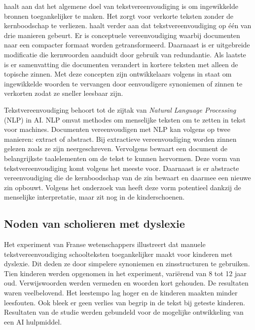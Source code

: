 \textcite{Shardlow2014} haalt aan dat het algemene doel van tekstvereenvoudiging is om ingewikkelde bronnen toegankelijker te maken. Het zorgt voor verkorte teksten zonder de kernboodschap te verliezen. \textcite{Siddharthan2014} haalt verder aan dat tekstvereenvoudiging op één van drie manieren gebeurt. Er is conceptuele vereenvoudiging waarbij documenten naar een compacter formaat worden getransformeerd. Daarnaast is er uitgebreide modificatie die kernwoorden aanduidt door gebruik van redundantie. Als laatste is er samenvatting die documenten verandert in kortere teksten met alleen de topische zinnen. Met deze concepten zijn ontwikkelaars volgens \textcite{Siddharthan2014} in staat om ingewikkelde woorden te vervangen door eenvoudigere synoniemen of zinnen te verkorten zodat ze sneller leesbaar zijn.

Tekstvereenvoudiging behoort tot de zijtak van \textit{Natural Language Processing} (NLP) in AI. NLP omvat methodes om menselijke teksten om te zetten in tekst voor machines. Documenten vereenvoudigen met NLP kan volgens \textcite{Chowdhary2020} op twee manieren: extract of abstract. Bij extractieve vereenvoudiging worden zinnen gelezen zoals ze zijn neergeschreven. Vervolgens bewaart een document de belangrijkste taalelementen om de tekst te kunnen hervormen. Deze vorm van tekstvereenvoudiging komt volgens \autocite{Sciforce2020} het meeste voor. Daarnaast is er abstracte vereenvoudiging die de kernboodschap van de zin bewaart en daarmee een nieuwe zin opbouwt. Volgens het onderzoek van \textcite{Chowdhary2020} heeft deze vorm potentieel dankzij de menselijke interpretatie, maar zit nog in de kinderschoenen.

\subsection{Noden van scholieren met dyslexie}

Het experiment van Franse wetenschappers \newline \textcite{Gala2016} illustreert dat manuele tekstvereenvoudiging schoolteksten toegankelijker \newline maakt voor kinderen met dyslexie. Dit deden ze door simpelere synoniemen en zinsstructuren te gebruiken. Tien kinderen werden opgenomen in het experiment, variërend van 8 tot 12 jaar oud. Verwijswoorden werden vermeden en woorden kort gehouden. De resultaten waren veelbelovend. Het leestempo lag hoger en de kinderen maakten minder leesfouten. Ook bleek er geen verlies van begrip in de tekst bij geteste kinderen. Resultaten van de studie werden gebundeld voor de mogelijke ontwikkeling van een AI hulpmiddel.

